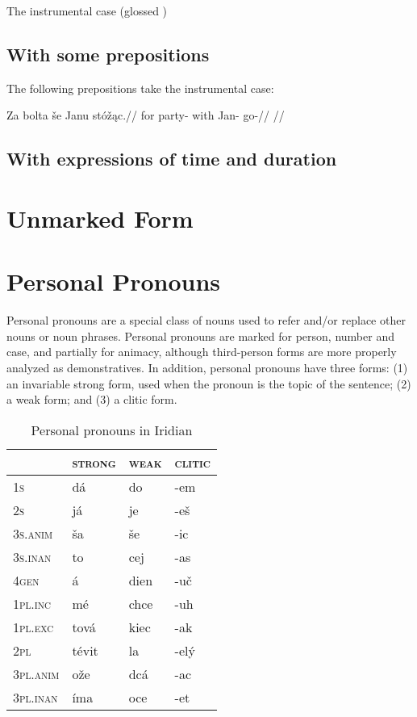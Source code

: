 The instrumental case (glossed )

\subsection{With some prepositions}

The following prepositions take the instrumental case:  

\pex
\begingl
\gla Za bolta \v{s}e Janu st\'o\v{z}\k{a}c.//
\glb for party- with Jan- go-//
\glft {}//
\endgl
\xe

\subsection{With expressions of time and duration}

\section{Unmarked Form}


\section{Personal Pronouns}

Personal pronouns are a special class of nouns used to refer and/or replace other nouns or noun phrases. Personal pronouns are marked for person, number and case, and partially for animacy, although third-person forms are more properly analyzed as demonstratives. In addition, personal pronouns have three forms: (1) an invariable strong form, used when the pronoun is the topic of the sentence; (2) a weak form; and (3) a clitic form.

\begin{table}[h!]
	\caption{Personal pronouns in Iridian}
	\centering\small
	\begin{tabularx}{0.8\textwidth}{>{\scshape}YMMM}

		\toprule
		 &\textsc{strong} &\textsc{weak}&\textsc{clitic}\\
		\midrule
		1s &dá&do&-em\\ \addlinespace
		2s&já&je&-e\v{s}\\ \addlinespace
		3s.anim&\v{s}a&\v{s}e&-ic\\ \addlinespace
		3s.inan&to&cej&-as\\ \addlinespace
		4gen&á&dien&-u\v{c}\\ \addlinespace
		1pl.inc&m\'e&chce&-uh\\ \addlinespace
		1pl.exc&tov\'a&kiec&-ak\\ \addlinespace
		2pl&t\'evit&la&-elý\\ \addlinespace
		3pl.anim&o\v{z}e&dcá&-ac\\ \addlinespace
		3pl.inan&\'ima&oce&-et\\ \bottomrule
	\end{tabularx}
\end{table}


